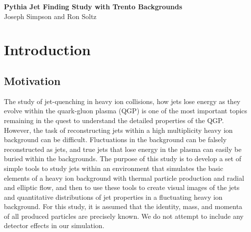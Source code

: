\documentclass[11pt]{article}
\begin{document}
%
%
\newcommand{\zapspace}{\topsep=1pt\partopsep=1pt\itemsep=1pt\parskip=2pt}
\newcommand{\trento}{\mbox{T$_{\rm R}$ENTo}}

\begin{center}
{\Large \bf Pythia Jet Finding Study with Trento Backgrounds\\}
\bigskip
Joseph Simpson and Ron Soltz
\end{center}

\begin{abstract}
We present results applying the Pythia SlowJet Finder to Pythia generated QCD and QED hard processes in the presence of simulated heavy ion backgrounds.  The hard process events are generated with Pythia version~8.219 for $\sqrt{s}$200~GeV proton-proton collisions and the backgrounds are generated by the Reduced Thickness Event-by-event Nuclear Topology model \trento\ for Au-Au collisions with a nucleon-nucleon cross-section of 4.23~fm$^2$.  The \trento\ model is used to determine the initial entropy and ellipticity from which the total charged particle multiplicity and elliptic flow are determined.  We report results in the form of event displays, total $p_T$ distributions, and fragmentation distributions for SlowJet applied to Pythia events with and without the simulated heavy ion backgrounds.
\end{abstract}

\tableofcontents

\newpage 

\section{Introduction}
\subsection*{Motivation}

The study of jet-quenching in heavy ion collisions, how jets lose energy as they evolve within the quark-gluon plasma (QGP) is one of the most important topics remaining in the quest to understand the detailed properties of the QGP.  However, the task of reconstructing jets within a high multiplicity heavy ion background can be difficult.  Fluctuations in the background can be falsely reconstructed as jets, and true jets that lose energy in the plasma can easily be buried within the backgrounds.  The purpose of this study is to develop a set of simple tools to study jets within an environment that simulates the basic elements of a heavy ion background with thermal particle production and radial and elliptic flow, and then to use these tools to create visual images of the jets and quantitative distributions of jet properties in a fluctuating heavy ion background.  For this study, it is assumed that the identity, mass, and momenta of all produced particles are precisely known.  We do not attempt to include any detector effects in our simulation.
\end{document}
